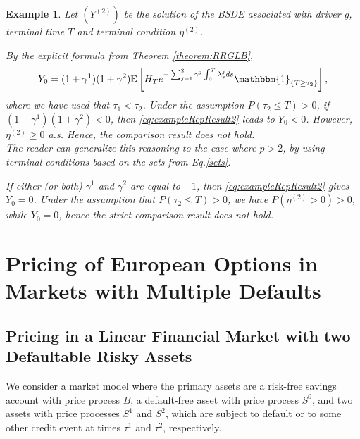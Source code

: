 \documentclass[11pt,a4paper]{article}
\numberwithin{equation}{section}
\theoremstyle{newPlain}
\theoremstyle{newDefinition}
\theoremstyle{newRemark}
\newtheorem{example}[theorem]{Example}
\begin{document}
{\begin{example}
    Let $(Y^{(2)})$ be the solution of the BSDE associated with  driver $g$, terminal time $T$ and terminal condition $\eta^{(2)}$. 

    By the explicit formula  from Theorem \ref{theorem:RRGLB},
    \begin{equation}\label{eq:exampleRepResult2}
        Y_0 = (1+\gamma^1)(1+\gamma^2)\mathbb{E}\left[H_Te^{-\sum_{j=1}^2\gamma^j\int_0^T\lambda_s^jds}\mathbbm{1}_{\{T\ge\tau_2\}}\right],
    \end{equation}
where we have used that $\tau_1<\tau_2$.
    Under the assumption $P(\tau_2\leq T)>0$, if $(1+\gamma^1)(1+\gamma^2)<0$, then \eqref{eq:exampleRepResult2} leads to $Y_0<0$. However,  $\eta^{(2)}\ge0$ a.s. Hence, the comparison result does not hold.\\
    The reader can generalize this reasoning to the case where $p>2$, by using terminal conditions based on the sets  from Eq.\eqref{sets}.  
    
    
    If either (or both)  $\gamma^1$ and $\gamma^2$ are equal to $-1$, then \eqref{eq:exampleRepResult2} gives $Y_0=0$. Under the assumption that $P(\tau_2\leq T)>0$, we have $P(\eta^{(2)}>0)>0$, while $Y_0=0$, hence the strict comparison result does not hold.
\end{example}




\section{Pricing of European Options in Markets with Multiple Defaults}\label{sec:Pricing}

\subsection{ Pricing in a Linear Financial Market with two Defaultable Risky Assets}\label{subsec:LinearPricing1}

We consider a market model where the primary assets are a risk-free savings account with price process $B$, a default-free asset with price process $S^0$, and two assets with price processes  $S^1$ and $S^2$,  which are subject to default or to some other credit event at times $\tau^1$ and $\tau^2$, respectively.

}
\end{document}

